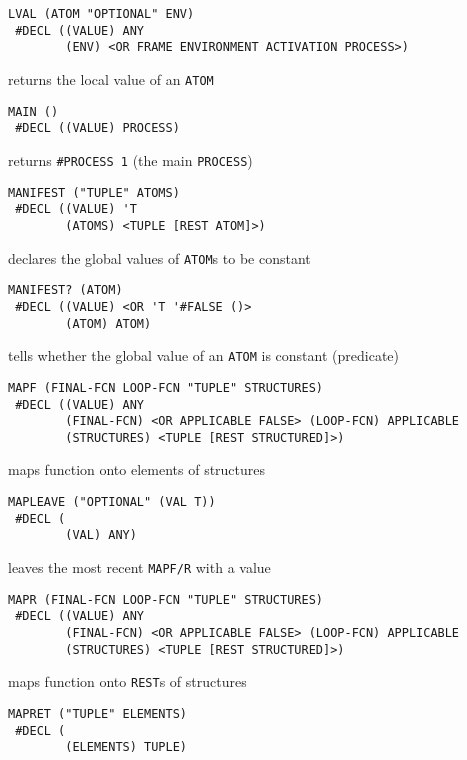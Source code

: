 \documentclass[a4paper,]{article}
\begin{document}
\begin{verbatim}
LVAL (ATOM "OPTIONAL" ENV)
 #DECL ((VALUE) ANY
        (ENV) <OR FRAME ENVIRONMENT ACTIVATION PROCESS>)
\end{verbatim}

returns the local value of an \texttt{ATOM}

\begin{verbatim}
MAIN ()
 #DECL ((VALUE) PROCESS)
\end{verbatim}

returns \texttt{\#PROCESS\ 1} (the main \texttt{PROCESS})

\begin{verbatim}
MANIFEST ("TUPLE" ATOMS)
 #DECL ((VALUE) 'T
        (ATOMS) <TUPLE [REST ATOM]>)
\end{verbatim}

declares the global values of \texttt{ATOM}s to be constant

\begin{verbatim}
MANIFEST? (ATOM)
 #DECL ((VALUE) <OR 'T '#FALSE ()>
        (ATOM) ATOM)
\end{verbatim}

tells whether the global value of an \texttt{ATOM} is constant (predicate)

\begin{verbatim}
MAPF (FINAL-FCN LOOP-FCN "TUPLE" STRUCTURES)
 #DECL ((VALUE) ANY
        (FINAL-FCN) <OR APPLICABLE FALSE> (LOOP-FCN) APPLICABLE
        (STRUCTURES) <TUPLE [REST STRUCTURED]>)
\end{verbatim}

maps function onto elements of structures

\begin{verbatim}
MAPLEAVE ("OPTIONAL" (VAL T))
 #DECL (
        (VAL) ANY)
\end{verbatim}

leaves the most recent \texttt{MAPF/R} with a value

\begin{verbatim}
MAPR (FINAL-FCN LOOP-FCN "TUPLE" STRUCTURES)
 #DECL ((VALUE) ANY
        (FINAL-FCN) <OR APPLICABLE FALSE> (LOOP-FCN) APPLICABLE
        (STRUCTURES) <TUPLE [REST STRUCTURED]>)
\end{verbatim}

maps function onto \texttt{REST}s of structures

\begin{verbatim}
MAPRET ("TUPLE" ELEMENTS)
 #DECL (
        (ELEMENTS) TUPLE)
\end{verbatim}
\end{document}
